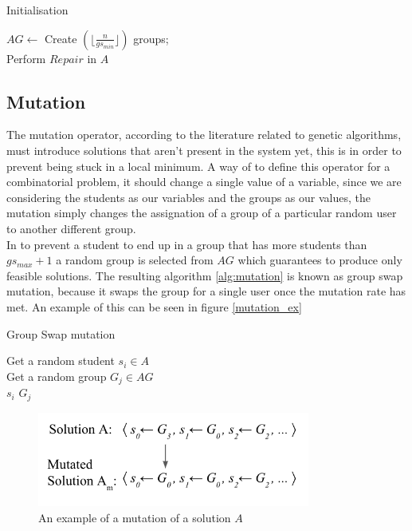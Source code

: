 \begin{algorithm}[H]
\caption{Initialisation}
\label{alg:initialisation}
\SetAlgoLined 
$AG \leftarrow$ Create $(\lfloor\frac{n}{gs_{min}}\rfloor)$ groups;\\
Perform $Repair$ in $A$
\end{algorithm}

\subsection{Mutation}

The mutation operator, according to the literature related to genetic algorithms, must introduce solutions that aren't present in the system yet, this is in order to prevent being stuck in a local minimum. A way of to define this operator for a combinatorial problem, it should change a single value of a variable, since we are considering the students as our variables and the groups as our values, the mutation simply changes the assignation of a group of a particular random user to another different group.\\

In to prevent a student to end up in a group that has more students than $gs_{max} + 1$ a random group is selected from $AG$ which guarantees to produce only feasible solutions. The resulting algorithm \ref{alg:mutation} is known as group swap mutation, because it swaps the group for a single user once the mutation rate has met. An example of this can be seen in figure \ref{mutation_ex}

\begin{algorithm}[H]
    \caption{Group Swap mutation}
    \label{alg:mutation}
    \SetAlgoLined 
    Get a random student $s_i \in A$\;\\
    Get a random group $G_j \in AG$\;\\
    $s_i$ \gets $G_j$ 
\end{algorithm}

\begin{figure}
    \centering
    \includegraphics[width=0.8\textwidth]{images/mutation_g.png}
    \caption{An example of a mutation of a solution $A$}
    \label{fig:mutation_ex}
\end{figure}

